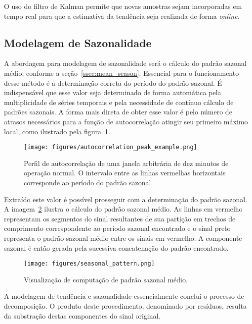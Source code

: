 O uso do filtro de Kalman permite que novas amostras sejam incorporadas em
tempo real para que a estimativa da tendência seja realizada de forma
\emph{online}.

\subsection{Modelagem de Sazonalidade}

A abordagem para modelagem de sazonalidade será o cálculo do padrão sazonal
médio, conforme a seção~\ref{ssec:mean_season}. Essencial para o funcionamento
desse método é a determinação correta do período do padrão sazonal. É
indispensável que esse valor seja determinado de forma automática pela
multiplicidade de séries temporais e pela necessidade de contínuo cálculo de
padrões sazonais. A forma mais direta de obter esse valor é pelo número de
atrasos necessários para a função de autocorrelação atingir seu primeiro
máximo local, como ilustrado pela figura~\ref{fig:acorr_peak}.

\begin{figure}[H]
    \centering
    \texttt{[image: figures/autocorrelation\_peak\_example.png]}
    \caption{Perfil de autocorrelação de uma janela arbitrária de dez minutos
    de operação normal. O intervalo entre as linhas vermelhas horizontais
    corresponde ao período do padrão sazonal.}
    \label{fig:acorr_peak}
\end{figure}

Extraído este valor é possível prosseguir com a determinação do padrão sazonal.
A imagem~\ref{fig:mean_seasonal_pattern} ilustra o cálculo do padrão sazonal
médio. As linhas em vermelho representam os segmentos do sinal resultantes de
sua partição em trechos de comprimento correspondente ao período sazonal
encontrado e o sinal preto representa o padrão sazonal médio entre os sinais em
vermelho. A componente sazonal é então gerada pela sucessiva concatenação do
padrão encontrado.

\begin{figure}[H]
    \centering
    \texttt{[image: figures/seasonal\_pattern.png]}
    \caption{Visualização de computação de padrão sazonal médio.}
    \label{fig:mean_seasonal_pattern}
\end{figure}

A modelagem de tendência e sazonalidade essencialmente conclui o processo de
decomposição. O produto deste procedimento, denominado por resíduos, resulta da
substração destas componentes do sinal original.

